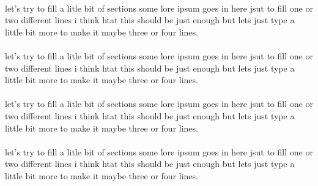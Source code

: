 \paragraph{}
let's try to fill a litle bit of sections some lore ipsum goes in here jsut to fill one or two different lines i think htat this should be just enough but lets just type a little bit more to make it maybe three or four lines.

\paragraph{}
let's try to fill a litle bit of sections some lore ipsum goes in here jsut to fill one or two different lines i think htat this should be just enough but lets just type a little bit more to make it maybe three or four lines.

\paragraph{}
let's try to fill a litle bit of sections some lore ipsum goes in here jsut to fill one or two different lines i think htat this should be just enough but lets just type a little bit more to make it maybe three or four lines.

\paragraph{}
let's try to fill a litle bit of sections some lore ipsum goes in here jsut to fill one or two different lines i think htat this should be just enough but lets just type a little bit more to make it maybe three or four lines.
